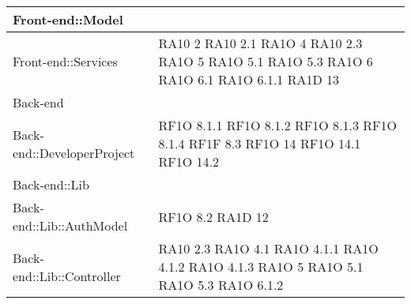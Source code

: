 \begin{center}
\begin{longtable}{|p{5cm}|p{3cm}|}
		Front-end::Model & \\ \hline
		
		Front-end::Services & RA10 2 \newline RA10 2.1 \newline RA1O 4 \newline RA10 2.3 \newline RA1O 5 \newline RA1O 5.1 \newline RA1O 5.3 \newline	RA1O 6 \newline 
		RA1O 6.1 \newline RA1O 6.1.1 \newline RA1D 13 \newline
		\\ \hline
	
	Back-end & \\ \hline
	
		Back-end::DeveloperProject & RF1O 8.1.1 \newline RF1O 8.1.2 \newline RF1O 8.1.3 RF1O 8.1.4 \newline RF1F 8.3 \newline RF1O 14 \newline
		RF1O 14.1 \newline RF1O 14.2 \newline 
		 \\ \hline
		
		Back-end::Lib & \\ \hline
		
			Back-end::Lib::AuthModel & RF1O 8.2 \newline RA1D 12 \newline 			\\ \hline
			
			Back-end::Lib::Controller & RA10 2.3 \newline RA1O 4.1 \newline RA1O 4.1.1 \newline RA1O 4.1.2 \newline  RA1O 4.1.3 \newline RA1O 5 \newline RA1O 5.1 \newline RA1O 5.3 \newline RA1O 6.1.2 \newline 
			 	\\ \hline
			

\end{longtable}
\end{center}
